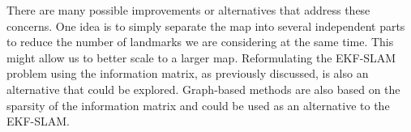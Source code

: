 There are many possible improvements or alternatives that address these concerns. One idea is to simply separate the map into several independent parts to reduce the number of landmarks we are considering at the same time. This might allow us to better scale to a larger map. Reformulating the EKF-SLAM problem using the information matrix, as previously discussed, is also an alternative that could be explored. Graph-based methods are also based on the sparsity of the information matrix and could be used as an alternative to the EKF-SLAM. 

